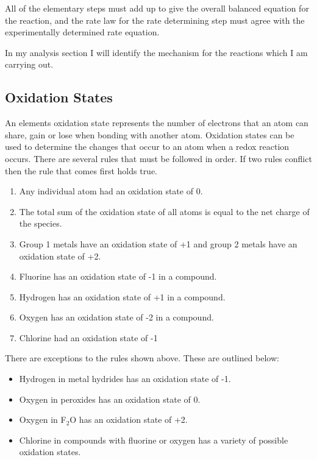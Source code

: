 All of the elementary steps must add up to give the overall balanced equation for the reaction, and the rate law for the rate determining step must agree with the experimentally determined rate equation.


In my analysis section I will identify the mechanism for the reactions which I am carrying out.

	\subsection{Oxidation States}

An elements oxidation state represents the number of electrons that an atom can share, gain or lose when bonding with another atom. Oxidation states can be used to determine the changes that occur to an atom when a redox reaction occurs. There are several rules that must be followed in order. If two rules conflict then the rule that comes first holds true.

\begin{enumerate}
\item Any individual atom had an oxidation state of 0.
\item The total sum of the oxidation state of all atoms is equal to the net charge of the species.
\item Group 1 metals have an oxidation state of +1 and group 2 metals have an oxidation state of +2.
\item Fluorine has an oxidation state of -1 in a compound.
\item Hydrogen has an oxidation state of +1 in a compound.
\item Oxygen has an oxidation state of -2 in a compound.
\item Chlorine had an oxidation state of -1
\end{enumerate}

There are exceptions to the rules shown above. These are outlined below:

\begin{itemize}
\item Hydrogen in metal hydrides has an oxidation state of -1.
\item Oxygen in peroxides has an oxidation state of 0.
\item Oxygen in F$_2$O has an oxidation state of +2.
\item Chlorine in compounds with fluorine or oxygen has a variety of possible oxidation states.
\end{itemize}

